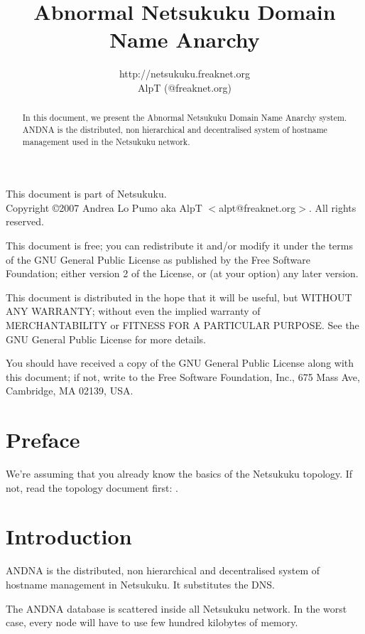 \documentclass[a4paper]{article}
\title{Abnormal Netsukuku Domain Name Anarchy}
\author{http://netsukuku.freaknet.org\\AlpT (@freaknet.org)}
\begin{document}
\maketitle

\begin{abstract}
	In this document, we present the Abnormal Netsukuku Domain Name
	Anarchy system. ANDNA is the distributed, non hierarchical and
	decentralised system of hostname management used in the Netsukuku
	network.
\end{abstract}
\pagebreak
\begin{small}
  This document is part of Netsukuku.\\
  Copyright \copyright 2007 Andrea Lo Pumo aka AlpT $<$alpt@freaknet.org$>$.
  All rights reserved.

  This document is free; you can redistribute it and/or modify it
  under the terms of the GNU General Public License as published by
  the Free Software Foundation; either version 2 of the License, or
  (at your option) any later version.

  This document is distributed in the hope that it will be useful, but
  WITHOUT ANY WARRANTY; without even the implied warranty of
  MERCHANTABILITY or FITNESS FOR A PARTICULAR PURPOSE\@.  See the GNU
  General Public License for more details.

  You should have received a copy of the GNU General Public License
  along with this document; if not, write to the Free Software
  Foundation, Inc., 675 Mass Ave, Cambridge, MA 02139, USA.
\end{small}

\clearpage
\tableofcontents
\clearpage
{}
\section{Preface}
\label{sec:preface}

We're assuming that you already know the basics of the Netsukuku topology. If not, read the
topology document first: \cite{ntktopology}.

\section{Introduction}
ANDNA is the distributed, non hierarchical and decentralised system of
hostname management in Netsukuku. It substitutes the DNS. 

The ANDNA database is scattered inside all Netsukuku network. In the worst
case, every node will have to use few hundred kilobytes of memory.
\end{document}

